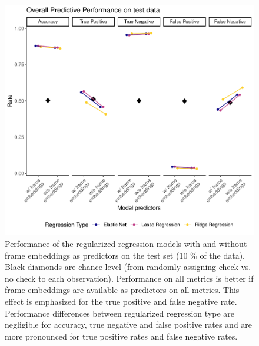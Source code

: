 \documentclass[
  man]{apa6}
\begin{document}
\begin{figure}
\includegraphics[width=0.95\linewidth]{FinalReport_files/figure-latex/fit-overall-1} \caption{Performance of the regularized regression models with and without frame embeddings as predictors on the test set (10 \% of the data). Black diamonds are chance level (from randomly assigning check vs. no check to each observation). Performance on all metrics is better if frame embeddings are available as predictors on all metrics. This effect is emphasized for the true positive and false negative rate. Performance differences between regularized regression type are negligible for accuracy, true negative and false positive rates and are more pronounced for true positive rates and false negative rates.}\label{fig:fit-overall}
\end{figure}
\end{document}
